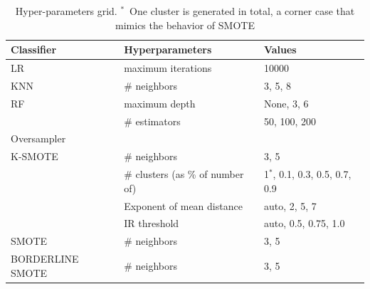 \documentclass[remotesensing,article,submit,moreauthors,pdftex]{Definitions/mdpi}
\begin{document}
\begin{table}
	\centering
    \captionsetup{justification=centering}
    \caption{Hyper-parameters grid. $^*$~One cluster is generated in total, a
    corner case that mimics the behavior of SMOTE
    }\label{tab:grid}
    \begin{tabular}{lll}
		\toprule
		Classifier       & Hyperparameters      & Values                            \\
		\midrule
		LR               & maximum iterations   & 10000                             \\
		KNN              & \# neighbors  & {3, 5, 8}                            \\
		RF               & maximum depth        & {None, 3, 6}                      \\
		                 & \# estimators & {50, 100, 200}                         \\
		\toprule
		Oversampler      &                      &                                   \\
		\midrule
		K-SMOTE          & \# neighbors  & {3, 5}                            \\
		                 & \# clusters (as \% of number of\replaced{ instances}{ observations})   & {1$^*$, 0.1, 0.3, 0.5, 0.7, 0.9}      \\
                         & Exponent of mean distance & {auto, 2, 5, 7}       \\
                         & IR threshold  & {auto, 0.5, 0.75, 1.0}            \\
		SMOTE            & \# neighbors  & {3, 5}                            \\
		BORDERLINE SMOTE & \# neighbors  & {3, 5}                            \\
		\bottomrule
	\end{tabular}
\end{table}
\end{document}
